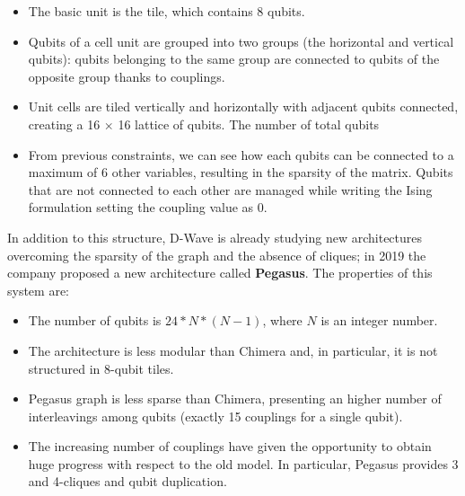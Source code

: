 \begin{itemize}
    \item The basic unit is the tile, which contains 8 qubits.
    \item Qubits of a cell unit are grouped into two groups (the horizontal and vertical qubits): qubits belonging to the same group are connected to qubits of the opposite group thanks to couplings.
    \item Unit cells are tiled vertically and horizontally with adjacent qubits connected, creating a 16 $\times$ 16 lattice of qubits. The number of total qubits 
    \item From previous constraints, we can see how each qubits can be connected to a maximum of 6 other variables, resulting in the sparsity of the matrix. Qubits that are not connected to each other are managed while writing the Ising formulation setting the coupling value as 0.
\end{itemize}

In addition to this structure, D-Wave is already studying new architectures overcoming the sparsity of the graph and the absence of cliques; in 2019 the company proposed a new architecture called \textbf{Pegasus}. The properties of this system are:

\begin{itemize}
    \item The number of qubits is $24*N*(N-1)$, where $N$ is an integer number.
    \item The architecture is less modular than Chimera and, in particular, it is not structured in 8-qubit tiles.
    \item Pegasus graph is less sparse than Chimera, presenting an higher number of interleavings among qubits (exactly 15 couplings for a single qubit).
    \item The increasing number of couplings have given the opportunity to obtain huge progress with respect to the old model. In particular, Pegasus provides 3 and 4-cliques and qubit duplication.
\end{itemize}

